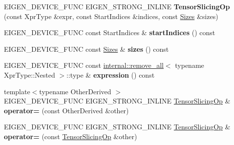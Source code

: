 \begin{DoxyCompactItemize}
\item 
\mbox{\label{class_eigen_1_1_tensor_slicing_op_a553fdec5d47afb65af1da109d37ad15c}} 
E\+I\+G\+E\+N\+\_\+\+D\+E\+V\+I\+C\+E\+\_\+\+F\+U\+NC E\+I\+G\+E\+N\+\_\+\+S\+T\+R\+O\+N\+G\+\_\+\+I\+N\+L\+I\+NE {\bfseries Tensor\+Slicing\+Op} (const Xpr\+Type \&expr, const Start\+Indices \&indices, const \hyperlink{struct_eigen_1_1_sizes}{Sizes} \&sizes)
\item 
\mbox{\label{class_eigen_1_1_tensor_slicing_op_a8eb9494ec4343f151afe604ed65f701b}} 
E\+I\+G\+E\+N\+\_\+\+D\+E\+V\+I\+C\+E\+\_\+\+F\+U\+NC const Start\+Indices \& {\bfseries start\+Indices} () const
\item 
\mbox{\label{class_eigen_1_1_tensor_slicing_op_ad5b754499aeaad56edcc4df3e278cc96}} 
E\+I\+G\+E\+N\+\_\+\+D\+E\+V\+I\+C\+E\+\_\+\+F\+U\+NC const \hyperlink{struct_eigen_1_1_sizes}{Sizes} \& {\bfseries sizes} () const
\item 
\mbox{\label{class_eigen_1_1_tensor_slicing_op_aa82a735a298601f917d2974eead04186}} 
E\+I\+G\+E\+N\+\_\+\+D\+E\+V\+I\+C\+E\+\_\+\+F\+U\+NC const \hyperlink{struct_eigen_1_1internal_1_1remove__all}{internal\+::remove\+\_\+all}$<$ typename Xpr\+Type\+::\+Nested $>$\+::type \& {\bfseries expression} () const
\item 
\mbox{\label{class_eigen_1_1_tensor_slicing_op_acdeb081c43ef587ae236da0b1b1f2deb}} 
{\footnotesize template$<$typename Other\+Derived $>$ }\\E\+I\+G\+E\+N\+\_\+\+D\+E\+V\+I\+C\+E\+\_\+\+F\+U\+NC E\+I\+G\+E\+N\+\_\+\+S\+T\+R\+O\+N\+G\+\_\+\+I\+N\+L\+I\+NE \hyperlink{class_eigen_1_1_tensor_slicing_op}{Tensor\+Slicing\+Op} \& {\bfseries operator=} (const Other\+Derived \&other)
\item 
\mbox{\label{class_eigen_1_1_tensor_slicing_op_a1aefa7f4315b7b894507820b1d8ef474}} 
E\+I\+G\+E\+N\+\_\+\+D\+E\+V\+I\+C\+E\+\_\+\+F\+U\+NC E\+I\+G\+E\+N\+\_\+\+S\+T\+R\+O\+N\+G\+\_\+\+I\+N\+L\+I\+NE \hyperlink{class_eigen_1_1_tensor_slicing_op}{Tensor\+Slicing\+Op} \& {\bfseries operator=} (const \hyperlink{class_eigen_1_1_tensor_slicing_op}{Tensor\+Slicing\+Op} \&other)
\end{DoxyCompactItemize}
